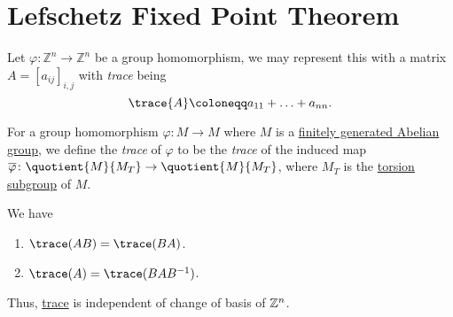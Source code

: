 \section{Lefschetz Fixed Point Theorem}
\begin{definition}[Trace]\label{def:trace}
	Let \(\varphi \colon \mathbb{Z}^n \to \mathbb{Z}^n\) be a group homomorphism, we may represent this with a matrix
	\(A = \left[a_{ij}\right]_{i, j}\) with \emph{trace} being
	\[
		\trace{A} \coloneqq a_{11} + \ldots + a_{nn}.
	\]

	For a group homomorphism \(\varphi \colon M \to M\) where \(M\) is a \hyperref[apx:ssc:finitely-generated-Abelian-group]{finitely generated Abelian group},
	we define the \emph{trace} of \(\varphi\) to be the \emph{trace} of the induced map \(\overline{\varphi} \colon \quotient{M}{M_T} \to \quotient{M}{M_T}\),
	where \(M_T\) is the \hyperref[def:torsion-subgroup]{torsion subgroup} of \(M\).
\end{definition}

\begin{exercise}
	We have
	\begin{enumerate}
		\item \(\trace(AB) = \trace(BA)\).
		\item \(\trace(A) = \trace(BAB^{-1})\).
	\end{enumerate}

	Thus, \hyperref[def:trace]{trace} is independent of change of basis of \(\mathbb{\MakeUppercase{z}} ^n\).
\end{exercise}